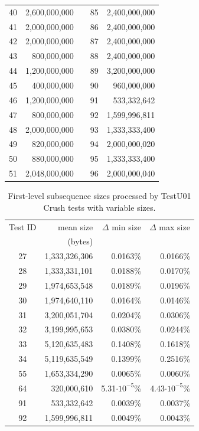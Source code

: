 \documentclass[
  digital,     %
  oneside,     %
  nosansbold,  %
  nocolorbold, %
  nolof,         %
  nolot,         %
]{fithesis4}
\begin{document}
\begin{longtable}[c]{l|rcl|r}
40 & 2,600,000,000 &  & 85 & 2,400,000,000\\
41 & 2,000,000,000 &  & 86 & 2,400,000,000\\
42 & 2,000,000,000 &  & 87 & 2,400,000,000\\
43 & 800,000,000 &  & 88 & 2,400,000,000\\
44 & 1,200,000,000 &  & 89 & 3,200,000,000\\
45 & 400,000,000 &  & 90 & 960,000,000\\
46 & 1,200,000,000 &  & 91 & 533,332,642\\
47 & 800,000,000 &  & 92 & 1,599,996,811\\
48 & 2,000,000,000 &  & 93 & 1,333,333,400\\
49 & 820,000,000 &  & 94 & 2,000,000,020\\
50 & 880,000,000 &  & 95 & 1,333,333,400\\
51 & 2,048,000,000 &  & 96 & 2,000,000,040\\

 \end{longtable}


\begin{table}[h]
  \begin{tabularx}{0.75\textwidth}{c|r|r|r}
   Test ID & mean size & $\Delta$ min size & $\Delta$ max size\\
     & (bytes) & & \\
    \midrule
    27&1,333,326,306&0.0163\%&0.0166\%\\
    28&1,333,331,101&0.0188\%&0.0170\%\\	
    29&1,974,653,548&0.0189\%&0.0196\%	\\
    30&1,974,640,110&0.0164\%&0.0146\%	\\
    31&3,200,051,704&0.0204\%&0.0306\%	\\
    32&3,199,995,653&0.0380\%&0.0244\%	\\
    33&5,120,635,483&0.1408\%&0.1618\%	\\
    34&5,119,635,549&0.1399\%&0.2516\%	\\
    55&1,653,334,290&0.0065\%&0.0060\%	\\
    64&320,000,610&5.31$\cdot10^{-5}$\% &4.43$\cdot10^{-5}$\%\\
    91&533,332,642&0.0039\%&0.0037\%	\\
    92&1,599,996,811&0.0049\%&0.0043\%\\

  \end{tabularx}
  \caption{First-level subsequence sizes processed by TestU01 Crush tests with variable sizes.}
  \label{tab:analysis_crush_variable}
\end{table}
\end{document}
